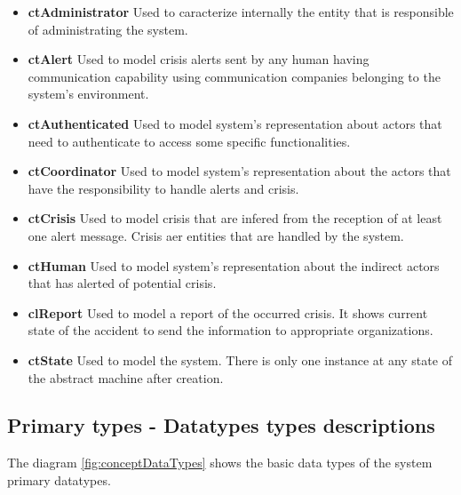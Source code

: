 \begin{itemize}

  	\item \textbf{ctAdministrator}
	Used to caracterize internally the entity that is responsible of administrating
	the \msricrash system.
	
	\item \textbf{ctAlert}
	Used to model crisis alerts sent by any human having communication capability
	using communication companies belonging to the system’s environment.
	
	\item \textbf{ctAuthenticated}
	Used to model system’s representation about actors that need to authenticate to
	access some specific functionalities.
	
	\item \textbf{ctCoordinator}
	Used to model system’s representation about the actors that have
	the responsibility to handle alerts and crisis.
	
	\item \textbf{ctCrisis} 
	Used to model crisis that are infered from the reception of at least
	one alert message. Crisis aer entities that are handled by the \msricrash system.
	
	\item \textbf{ctHuman} 
	Used to model system’s representation about the indirect actors that has
	alerted of potential crisis.
		
	\item \textbf{clReport}
	Used to model a report of the occurred crisis. 	It shows current state of the 
	accident to send the information to appropriate organizations.
	
	\item \textbf{ctState} 
	Used to model the system. There is only one instance at any state of the
	abstract machine after creation.

\end{itemize}

\subsection{Primary types - Datatypes types descriptions}

The diagram \ref{fig:conceptDataTypes} shows the basic data types of the
\msricrash system primary datatypes.

